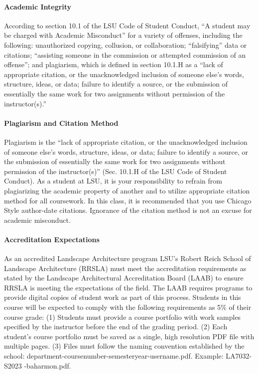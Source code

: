 \documentclass[11pt,article,oneside]{memoir}
\begin{document}
\paragraph{Academic Integrity}
According to section 10.1 of the LSU Code of Student Conduct, ``A student may be charged with Academic Misconduct'' for a variety of offenses, including the following: unauthorized copying, collusion, or collaboration; ``falsifying'' data or citations; ``assisting someone in the commission or attempted commission of an offense''; and plagiarism, which is defined in section 10.1.H as a ``lack of appropriate citation, or the unacknowledged inclusion of someone else's words, structure, ideas, or data; failure to identify a source, or the submission of essentially the same work for two assignments without permission of the instructor(s).''

\paragraph{Plagiarism and Citation Method}
Plagiarism is the ``lack of appropriate citation, or the unacknowledged inclusion of someone else's words, structure, ideas, or data; failure to identify a source, or the submission of essentially the same work for two assignments without permission of the instructor(s)'' (Sec. 10.1.H of the LSU Code of Student Conduct). As a student at LSU, it is your responsibility to refrain from plagiarizing the academic property of another and to utilize appropriate citation method for all coursework. In this class, it is recommended that you use Chicago Style author-date citations. Ignorance of the citation method is not an excuse for academic misconduct.

\paragraph{Accreditation Expectations}
As an accredited Landscape Architecture program
LSU's Robert Reich School of Landscape Architecture (RRSLA) 
must meet the accreditation requirements 
as stated by the Landscape Architectural Accreditation
Board (LAAB) to ensure RRSLA is meeting the expectations of the field. 
The LAAB requires programs to provide digital copies 
of student work as part of this process.
Students in this course will be expected 
to comply with the following requirements
as 5\% of their course grade: 
(1) Students must provide a course portfolio
with work samples specified by the instructor 
before the end of the grading period. 
(2) Each student's course portfolio must be saved as 
a single, high resolution PDF file with multiple pages. 
(3) Files must follow the naming convention
established by the school: department-coursenumber-semesteryear-username.pdf.
Example: LA7032-S2023 -baharmon.pdf.
\end{document}
